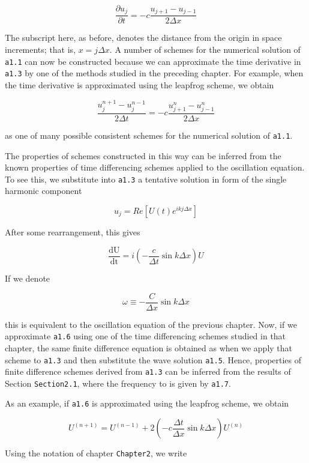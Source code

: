  {\[\frac{\partial u_{j}}{\partial t} = - c\frac{u_{j + 1} - u_{j - 1}}{2\Delta x}\]}

The subscript here, as before, denotes the distance from the origin in
space increments; that is, \(x = j\Delta x\). A number of schemes for
the numerical solution of \texttt{a1.1} can now be constructed because
we can approximate the time derivative in \texttt{a1.3} by one of the
methods studied in the preceding chapter. For example, when the time
derivative is approximated using the leapfrog scheme, we obtain

 {\[\frac{u_{j}^{n + 1} - u_{j}^{n - 1}}{2\Delta t} = - c\frac{u_{j + 1}^n - u_{j - 1}^n}{2\Delta x}\]}

as one of many possible consistent schemes for the numerical solution of
\texttt{a1.1}.

The properties of schemes constructed in this way can be inferred from
the known properties of time differencing schemes applied to the
oscillation equation. To see this, we substitute into \texttt{a1.3} a
tentative solution in form of the single harmonic component

 {\[u_{j} = Re\left\lbrack U\left( t \right)e^{ikj\Delta x} \right\rbrack\]}

After some rearrangement, this gives

 {\[\frac{\text{dU}}{\text{dt}} = i\left( - \frac{c}{\Delta t}\sin{k\Delta x} \right)U\]}

If we denote

 {\[\omega \equiv - \frac{C}{\Delta x}\sin{k\Delta x}\]}

this is equivalent to the oscillation equation of the previous chapter.
Now, if we approximate \texttt{a1.6} using one of the time differencing
schemes studied in that chapter, the same finite difference equation is
obtained as when we apply that scheme to \texttt{a1.3} and then
substitute the wave solution \texttt{a1.5}. Hence, properties of finite
difference schemes derived from \texttt{a1.3} can be inferred from the
results of Section \texttt{Section2.1}, where the frequency to is given
by \texttt{a1.7}.

As an example, if \texttt{a1.6} is approximated using the leapfrog
scheme, we obtain

 {\[U^{\left( n + 1 \right)} = U^{\left( n - 1 \right)} + 2\left( - c\frac{\Delta t}{\Delta x}\sin{k\Delta x} \right)U^{\left( n \right)}\]}

Using the notation of chapter \texttt{Chapter2}, we write

